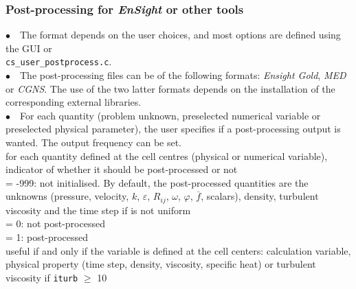 \subsubsection{Post-processing for {\em EnSight} or other tools}

$\bullet\quad$The format depends on the user choices, and most options
are defined using the GUI or \\
\texttt{cs\_user\_postprocess.c}.\\
$\bullet\quad$The post-processing files can be of the following formats: {\em Ensight Gold},
{\em MED} or {\em CGNS}. The use of the two latter formats depends on
the installation of the corresponding external libraries.\\
$\bullet\quad$For each quantity (problem unknown, preselected numerical
variable or preselected physical parameter), the user specifies if a
post-processing output is wanted. The output frequency can be set.\\

{for each quantity defined at the cell centres (physical or numerical
variable), indicator of whether it should be post-processed or not \\
\hspace*{1.3cm}= -999: not initialised. By default, the post-processed
quantities are the unknowns (pressure, velocity, $k$, $\varepsilon$,
$R_{ij}$, $\omega$, $\varphi$, $\overline{f}$, scalars), density,
turbulent viscosity and the time step if is not uniform\\
\hspace*{1.3cm}= 0: not post-processed\\
\hspace*{1.3cm}= 1: post-processed\\
useful if and only if the variable is defined at the cell centers:
calculation variable, physical property (time step, density,
viscosity, specific heat) or turbulent viscosity if {\tt iturb}
$\geqslant$ 10}

